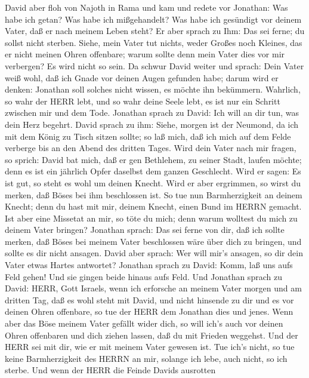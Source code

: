  David aber floh von Najoth in Rama und kam und redete vor
Jonathan: Was habe ich getan? Was habe ich mißgehandelt? Was habe ich
gesündigt vor deinem Vater, daß er nach meinem Leben steht? 
Er aber sprach zu Ihm: Das sei ferne; du sollst nicht sterben. Siehe,
mein Vater tut nichts, weder Großes noch Kleines, das er nicht meinen
Ohren offenbare; warum sollte denn mein Vater dies vor mir verbergen? Es
wird nicht so sein.  Da schwur David weiter und sprach: Dein
Vater weiß wohl, daß ich Gnade vor deinen Augen gefunden habe; darum
wird er denken: Jonathan soll solches nicht wissen, es möchte ihn
bekümmern. Wahrlich, so wahr der HERR lebt, und so wahr deine Seele
lebt, es ist nur ein Schritt zwischen mir und dem Tode. 
Jonathan sprach zu David: Ich will an dir tun, was dein Herz begehrt.
 David sprach zu ihm: Siehe, morgen ist der Neumond, da ich
mit dem König zu Tisch sitzen sollte; so laß mich, daß ich mich auf dem
Felde verberge bis an den Abend des dritten Tages.  Wird
dein Vater nach mir fragen, so sprich: David bat mich, daß er gen
Bethlehem, zu seiner Stadt, laufen möchte; denn es ist ein jährlich
Opfer daselbst dem ganzen Geschlecht.  Wird er sagen: Es ist
gut, so steht es wohl um deinen Knecht. Wird er aber ergrimmen, so wirst
du merken, daß Böses bei ihm beschlossen ist.  So tue nun
Barmherzigkeit an deinem Knecht; denn du hast mit mir, deinem Knecht,
einen Bund im HERRN gemacht. Ist aber eine Missetat an mir, so töte du
mich; denn warum wolltest du mich zu deinem Vater bringen? 
Jonathan sprach: Das sei ferne von dir, daß ich sollte merken, daß Böses
bei meinem Vater beschlossen wäre über dich zu bringen, und sollte es
dir nicht ansagen.  David aber sprach: Wer will mir's
ansagen, so dir dein Vater etwas Hartes antwortet? 
Jonathan sprach zu David: Komm, laß uns aufs Feld gehen! Und sie gingen
beide hinaus aufs Feld.  Und Jonathan sprach zu David:
HERR, Gott Israels, wenn ich erforsche an meinem Vater morgen und am
dritten Tag, daß es wohl steht mit David, und nicht hinsende zu dir und
es vor deinen Ohren offenbare,  so tue der HERR dem
Jonathan dies und jenes. Wenn aber das Böse meinem Vater gefällt wider
dich, so will ich's auch vor deinen Ohren offenbaren und dich ziehen
lassen, daß du mit Frieden weggehst. Und der HERR sei mit dir, wie er
mit meinem Vater gewesen ist.  Tue ich's nicht, so tue
keine Barmherzigkeit des HERRN an mir, solange ich lebe, auch nicht, so
ich sterbe.  Und wenn der HERR die Feinde Davids ausrotten

